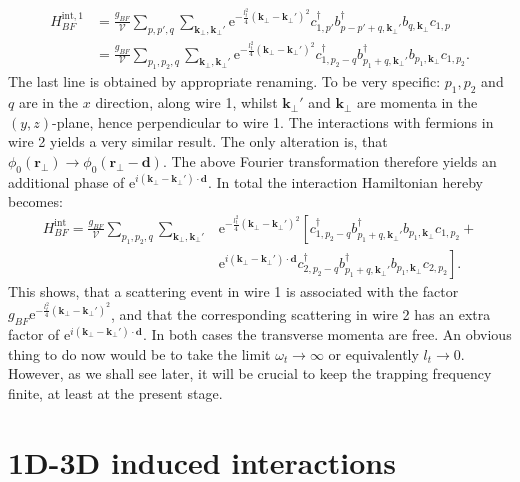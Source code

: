 \begin{align}
H_{BF}^{\text{int}, 1} &= \frac{g_{BF}}{\mathcal{V}}\sum_{p, p', q} \sum_{\mathbf{k}_\perp, \mathbf{k}_\perp'} \text{e}^{-\frac{l_t^2}{4}(\mathbf{k}_\perp-\mathbf{k}_\perp')^2} c^\dagger_{1, p'} b^\dagger_{p - p' + q, \mathbf{k}_\perp'} b_{q, \mathbf{k}_\perp}c_{1, p} \nonumber \\
                  &= \frac{g_{BF}}{\mathcal{V}}\sum_{p_1, p_2, q} \sum_{\mathbf{k}_\perp, \mathbf{k}_\perp'} \text{e}^{-\frac{l_t^2}{4}(\mathbf{k}_\perp-\mathbf{k}_\perp')^2} c_{1, p_2 - q}^\dagger b_{p_1 + q, \mathbf{k}_\perp'}^\dagger b_{p_1, \mathbf{k}_\perp}c_{1, p_2}.
\end{align}
The last line is obtained by appropriate renaming. To be very specific: $p_1, p_2$ and $q$ are in the $x$ direction, along wire 1, whilst $\mathbf{k}_\perp'$ and $\mathbf{k}_\perp$ are momenta in the $(y,z)$-plane, hence perpendicular to wire 1. The interactions with fermions in wire 2 yields a very similar result. The only alteration is, that $\phi_0(\mathbf{r}_\perp) \to \phi_0(\mathbf{r}_\perp - \mathbf{d})$. The above Fourier transformation therefore yields an additional phase of $\text{e}^{i(\mathbf{k}_\perp - \mathbf{k}_\perp')\cdot \mathbf{d}}$. In total the interaction Hamiltonian hereby becomes:
\begin{align}
H_{BF}^\text{int} = \frac{g_{BF}}{\mathcal{V}}\sum_{p_1,p_2,q} \sum_{\mathbf{k}_\perp, \mathbf{k}_\perp'} & \text{e}^{-\frac{l_t^2}{4}(\mathbf{k}_\perp - \mathbf{k}_\perp')^2}\left[ c^\dagger_{1,p_2-q} b^\dagger_{p_1+q, \mathbf{k}_\perp'} b_{p_1,\mathbf{k}_\perp}c_{1,p_2} + \right. \nonumber \\
& \left. \text{e}^{i(\mathbf{k}_\perp - \mathbf{k}_\perp')\cdot \mathbf{d}}c_{2,p_2-q}^\dagger b_{p_1+q, \mathbf{k}_\perp'}^\dagger b_{p_1,\mathbf{k}_\perp}c_{2,p_2} \right].
\end{align}
This shows, that a scattering event in wire 1 is associated with the factor $g_{BF} \text{e}^{-\frac{l_t^2}{4}(\mathbf{k}_\perp - \mathbf{k}_\perp')^2}$, and that the corresponding scattering in wire 2 has an extra factor of $\text{e}^{i(\mathbf{k}_\perp - \mathbf{k}_\perp')\cdot \mathbf{d}}$. In both cases the transverse momenta are free. An obvious thing to do now would be to take the limit $\omega_t \to \infty$ or equivalently $l_t \to 0$. However, as we shall see later, it will be crucial to keep the trapping frequency finite, at least at the present stage.  

\section{1D-3D induced interactions} \label{sec.1D3Dinducedinteraction}
